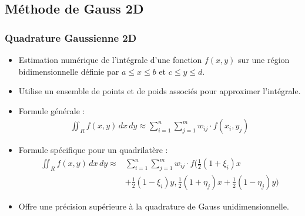 \documentclass[10pt]{beamer}
\begin{document}
\subsection{Méthode de Gauss 2D}
\begin{frame}
    \frametitle{Quadrature Gaussienne 2D}
    \footnotesize
    \begin{itemize}
        \item Estimation numérique de l'intégrale d'une fonction $f(x, y)$ sur une région bidimensionnelle définie par $a \leq x \leq b$ et $c \leq y \leq d$.
        
        \item Utilise un ensemble de points et de poids associés pour approximer l'intégrale.
        
        \item Formule générale :
            \begin{align*}
            \iint_{R} f(x, y) \,dx\,dy \approx \sum_{i=1}^{n} \sum_{j=1}^{m} w_{ij} \cdot f(x_i, y_j)
            \end{align*}
        
        \item Formule spécifique pour un quadrilatère :
            \begin{align*}
            \iint_{R} f(x, y) \,dx\,dy \approx & \sum_{i=1}^{n} \sum_{j=1}^{m} w_{ij} \cdot f\Bigg(\frac{1}{2}(1 + \xi_i)x\\
             &+ \frac{1}{2}(1 - \xi_i)y, \frac{1}{2}(1 + \eta_j)x + \frac{1}{2}(1 - \eta_j)y\Bigg)
            \end{align*}
        
        \item Offre une précision supérieure à la quadrature de Gauss unidimensionnelle.
    \end{itemize}
\end{frame}
\end{document}
